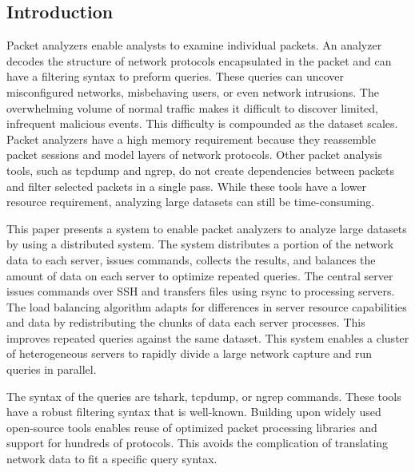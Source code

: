 \documentclass{article}
\begin{document}
\begin{multicols}{2}
  
\section*{Introduction} %


Packet analyzers enable analysts to examine individual packets.  An analyzer decodes the structure of network protocols encapsulated in the packet and can have a filtering syntax to preform queries.  These queries can uncover misconfigured networks, misbehaving users, or even network intrusions. The overwhelming volume of normal traffic makes it difficult to discover limited, infrequent malicious events. This difficulty is compounded as the dataset scales. Packet analyzers have a high memory requirement because they reassemble packet sessions and model layers of network protocols.  Other packet analysis tools, such as tcpdump and ngrep, do not create dependencies between packets and filter selected packets in a single pass. While these tools have a lower resource requirement, analyzing large datasets can still be time-consuming. 

This paper presents a system to enable packet analyzers to analyze large datasets by using a distributed system. The system distributes a portion of the network data to each server, issues commands, collects the results, and balances the amount of data on each server to optimize repeated queries. The central server issues commands over SSH and transfers files using rsync to processing servers. The load balancing algorithm adapts for differences in server resource capabilities and data by redistributing the chunks of data each server processes. This improves repeated queries against the same dataset. This system enables a cluster of heterogeneous servers to rapidly divide a large network capture and run queries in parallel. 

The syntax of the queries are tshark, tcpdump, or ngrep commands. These tools have a robust filtering syntax that is well-known. Building upon widely used open-source tools enables reuse of optimized packet processing libraries and support for hundreds of protocols. This avoids the complication of translating network data to fit a specific query syntax.  


\end{multicols}
\end{document}
